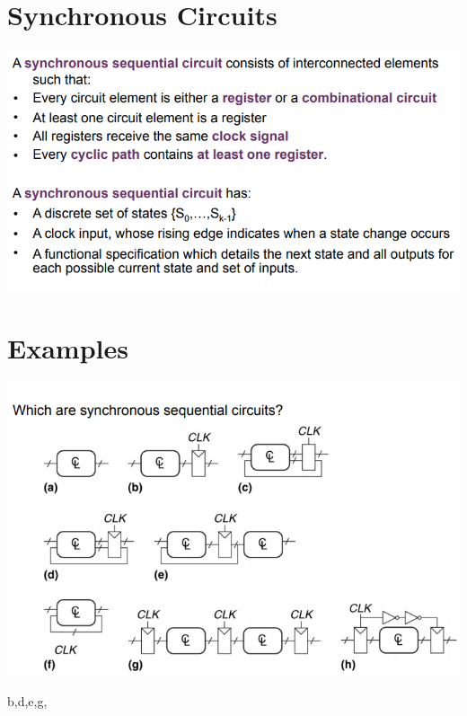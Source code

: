 \documentclass{article}[18pt]
\begin{document}
\section{Synchronous Circuits}
\begin{center}
	\includegraphics[scale=0.7]{figure14}
\end{center}
\section{Examples}
\begin{center}
	\includegraphics[scale=0.7]{figure15}
\end{center}
b,d,e,g,
\end{document}
